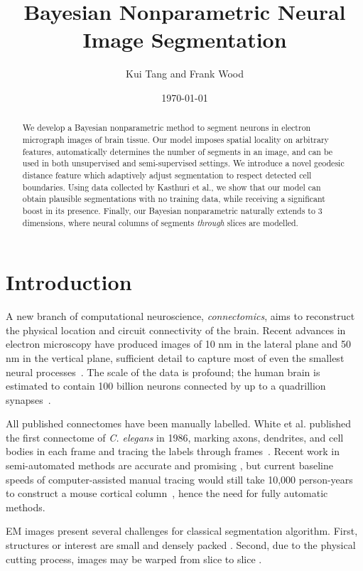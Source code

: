 \documentclass[english]{article}
\newcommand{\+}[1]{\ensuremath{\boldsymbol{\mathrm{#1}}}}
\begin{document}
\title{Bayesian Nonparametric Neural Image Segmentation}
\author{Kui Tang and Frank Wood}
\date{\today}
\maketitle
\begin{abstract}
We develop a Bayesian nonparametric method to segment neurons in electron micrograph images of brain tissue. Our model imposes spatial locality on arbitrary features, automatically determines the number of segments in an image, and can be used in both unsupervised and semi-supervised settings. We introduce a novel geodesic distance feature which adaptively adjust segmentation to respect detected cell boundaries. Using data collected by Kasthuri et al., we show that our model can obtain plausible segmentations with no training data, while receiving a significant boost in its presence. Finally, our Bayesian nonparametric naturally extends to 3 dimensions, where neural columns of segments \emph{through} slices are modelled.
\end{abstract}

\section{Introduction}
A new branch of computational neuroscience, \emph{connectomics}, aims to reconstruct the physical location and circuit connectivity of the brain. Recent advances in electron microscopy have produced images of 10 nm in the lateral plane and 50 nm in the vertical plane, sufficient detail to capture most of even the smallest neural processes~\cite{Briggman2006}. The scale of the data is profound; the human brain is estimated to contain 100 billion neurons connected by up to a quadrillion synapses~\cite{Kasthuri2010}.

All published connectomes have been manually labelled. White et al. published the first connectome of \emph{C. elegans} in 1986, marking axons, dendrites, and cell bodies in each frame and tracing the labels through frames~\cite{White12111986}. Recent work in semi-automated methods are accurate and promising \cite{Roberts2011,Unger2009,Jarrell2012,Bock2011}, but current baseline speeds of computer-assisted manual tracing would still take 10,000 person-years to construct a mouse cortical column~\cite{Briggman2006}, hence the need for fully automatic methods.

EM images present several challenges for classical segmentation algorithm. First, structures or interest are small and densely packed \cite{Jain2007}. Second, due to the physical cutting process, images may be warped from slice to slice \cite{Koshevoy2006}.
\end{document}
